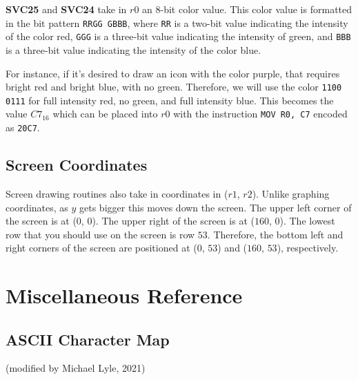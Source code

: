 \documentclass[12pt]{article}
\newcommand{\reg}[1]{$r#1$}
\begin{document}
\textbf{SVC25} and \textbf{SVC24} take in \reg{0} an 8-bit color value.  This color value is formatted in the bit pattern \texttt{RRGG GBBB}, where \texttt{RR} is a two-bit value indicating the intensity of the color red, \texttt{GGG} is a three-bit value indicating the intensity of green, and \texttt{BBB} is a three-bit value indicating the intensity of the color blue.

For instance, if it's desired to draw an icon with the color purple, that requires bright red and bright blue, with no green.  Therefore, we will use the color \texttt{1100 0111} for full intensity red, no green, and full intensity blue.  This becomes the value $C7_{16}$ which can be placed into \reg{0} with the instruction \texttt{MOV R0, C7} encoded as \texttt{20C7}.

\subsection{Screen Coordinates}

Screen drawing routines also take in coordinates in (\reg{1}, \reg{2}).  Unlike graphing coordinates, as $y$ gets bigger this moves down the screen.  The upper left corner of the screen is at ($0$, $0$).  The upper right of the screen is at ($160$, $0$).  The lowest row that you should use on the screen is row $53$. Therefore, the bottom left and right corners of the screen are positioned at ($0$, $53$) and ($160$, $53$), respectively.

\section{Miscellaneous Reference}
\subsection{ASCII Character Map}
\begin{center}

\small{(modified by Michael Lyle, 2021)}
\end{center}

\newpage
\end{document}
